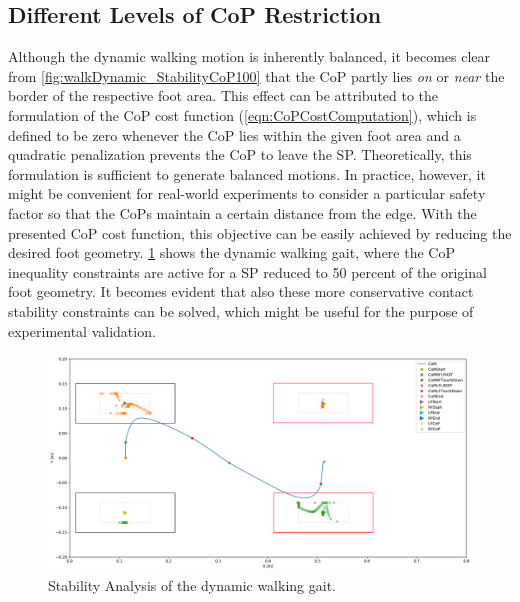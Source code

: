 \subsection{Different Levels of CoP Restriction}
Although the dynamic walking motion is inherently balanced, it becomes clear from \cref{fig:walkDynamic_StabilityCoP100} that the \gls{CoP} partly lies \textit{on} or \textit{near} the border of the respective foot area. This effect can be attributed to the formulation of the \gls{CoP} cost function (\cref{eqn:CoPCostComputation}), which is defined to be zero whenever the \gls{CoP} lies within the given foot area and a quadratic penalization prevents the \gls{CoP} to leave the \gls{SP}. 
Theoretically, this formulation is sufficient to generate balanced motions. 
In practice, however, it might be convenient for real-world experiments to consider a particular safety factor so that the \gls{CoP}s maintain a certain distance from the edge. With the presented \gls{CoP} cost function, this objective can be easily achieved by reducing the desired foot geometry. 
\cref{fig:walkDynamic_StabilityCoP50} shows the dynamic walking gait, where the \gls{CoP} inequality constraints are active for a \gls{SP} reduced to 50 percent of the original foot geometry. It becomes evident that also these more conservative contact stability constraints can be solved, which might be useful for the purpose of experimental validation. 
\begin{figure}[h!]
\centering	
\includegraphics[width=1\textwidth]{fig/walkDynamic/StabilityAnalysis_CoP50}
\caption{Stability Analysis of the dynamic walking gait.}
\label{fig:walkDynamic_StabilityCoP50}
\end{figure}

